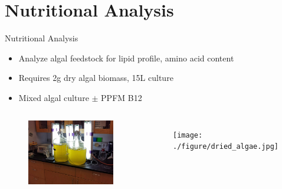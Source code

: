 \documentclass[8pt]{beamer}\usepackage[]{graphicx}\usepackage[]{color}
\begin{document}
\section{Nutritional Analysis}
\begin{frame}{Nutritional Analysis}
\begin{itemize}
\item Analyze algal feedstock for lipid profile, amino acid content
\item Requires 2g dry algal biomass, 15L culture
\item Mixed algal culture \(\pm\) PPFM B12
\end{itemize}
\begin{columns}[t] %
                \begin{figure}
                                \includegraphics[width=1\textwidth]{./figure/large_vol_algae.jpg}
                                \end{figure}
                                \begin{figure}
                                \texttt{[image: ./figure/dried\_algae.jpg]}
                                \end{figure}
        \end{columns}


\end{frame}
\end{document}
